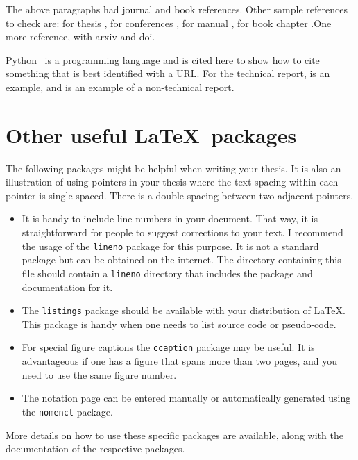 The above paragraphs had journal and book references. Other sample references to check are: for thesis \cite{Syed2013,Cheekati2014,Syed2020}, for conferences \cite{Sasidharan2017,Syed2018,Syed2018a}, for manual \cite{Ayachit2015},  for book chapter \cite{Ahren2005}.One more reference, \cite{Roenby2016} with arxiv and doi.

Python~\citep{py:python} is a programming language and is cited here to show how to cite something that is best identified with a URL. For the technical report, \cite{Syed2015} is an example, and \cite{UnitedNations2019} is an example of a non-technical report.

\section{Other useful \LaTeX\ packages}

The following packages might be helpful when writing your thesis. It is also an illustration of using pointers in your thesis where the text spacing within each pointer is single-spaced. There is a double spacing between two adjacent pointers.

\begin{itemize}  
	\item It is handy to include line numbers in your document. That way, it is straightforward for people to suggest corrections to your text. I recommend the usage of the \texttt{lineno} package for this purpose. It is not a standard package but can be obtained on the internet. The directory containing this file should contain a \verb|lineno| directory that includes the package and documentation for it.
	
	\item The \texttt{listings} package should be available with your
	distribution of \LaTeX.  This package is handy when one needs to list source code or pseudo-code.
	
	\item For special figure captions the \texttt{ccaption} package may be useful.  It is advantageous if one has a figure that spans more than two pages, and you need to use the same figure number.
	
	\item The notation page can be entered manually or automatically generated using the \texttt{nomencl} package.
	
\end{itemize}

More details on how to use these specific packages are available, along
with the documentation of the respective packages.
